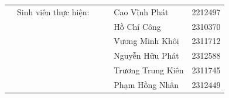 \begin{titlepage}
\begin{center}
\begin{table}[h]
\begin{tabular}{rrrrlr}
					& Sinh viên thực hiện: &&& Cao Vĩnh Phát & 2212497 \\[0.1cm]
					&                      &&& Hồ Chí Công & 2310370 \\[0.1cm]
					&                      &&& Vương Minh Khôi & 2311712 \\[0.1cm]
					&                      &&& Nguyễn Hữu Phát & 2312588 \\[0.1cm]
					&                      &&& Trương Trung Kiên & 2311745 \\[0.1cm]
					&                      &&& Phạm Hồng Nhân & 2312449 \\

				\end{tabular}
			\end{table}


		\end{center}


		\vspace{.6cm}
		\centering{\fontsize{12}{14}\selectfont {THÀNH PHỐ HỒ CHÍ MINH -- 05/2026}}
	\end{titlepage}
	\hypersetup{pageanchor=true}
	\newpage
	\fontsize{12}{15}{
		\tableofcontents
	}
	\newpage
	\fontsize{12}{18}
	\selectfont
	
	
	
	
	
	
	
	

